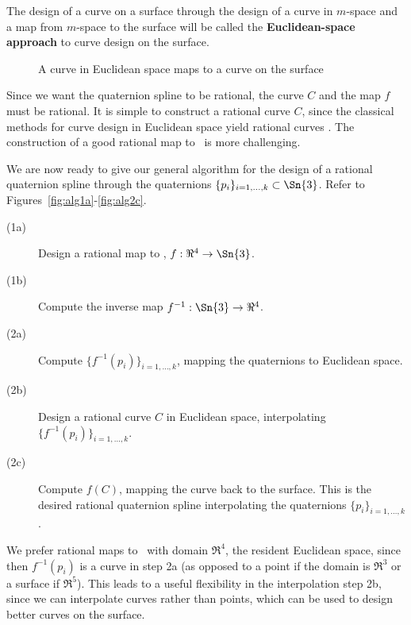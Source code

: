 \begin{defn2}
The design of a curve on a surface through the design of a curve in $m$-space
and a map from $m$-space to the surface will be called the {\bf Euclidean-space
approach} to curve design on the surface.
\end{defn2}
\begin{figure}
\vspace{2.5in}
\caption{A curve in Euclidean space maps to a curve on the surface}
\label{fig:reduce}
\end{figure}

Since we want the quaternion spline to be rational,
the curve $C$ and the map $f$ must be rational.
It is simple to construct a rational curve $C$,
since the classical methods for curve design in Euclidean space yield 
rational curves \cite{farin97}.
The construction of a good rational map to \ is more challenging.

We are now ready to give our general algorithm for the design of a rational
quaternion spline through the quaternions
$\{p_i\}_{i=1,\ldots,k} \subset \Sn{3}$.
Refer to Figures~\ref{fig:alg1a}-\ref{fig:alg2c}.
%
\begin{description}
\item[(1a)] Design a rational map to , $f:\Re^4 \rightarrow \Sn{3}$.
\item[(1b)] Compute the inverse map $f^{-1}:\Sn{3} \rightarrow \Re^4$.
\item[(2a)] Compute $\{f^{-1}(p_i)\}_{i=1,\ldots,k}$, 
	    mapping the quaternions to Euclidean space.
\item[(2b)] Design a rational curve $C$ in Euclidean space, interpolating $\{f^{-1}(p_i)\}_{i=1,\ldots,k}$.
\item[(2c)] Compute $f(C)$, mapping the curve back to the surface.
	    This is the desired rational quaternion spline interpolating
	    the quaternions $\{p_i\}_{i=1,\ldots,k}$.
\end{description}

We prefer rational maps to \ with domain $\Re^4$, the resident
Euclidean space, since then $f^{-1}(p_i)$ is a curve in step 2a
(as opposed to a point if the domain is $\Re^3$ or a surface if $\Re^5$).
This leads to a useful flexibility in the interpolation step 2b,
since we can interpolate curves rather than points,
which can be used to design better curves on the surface.

